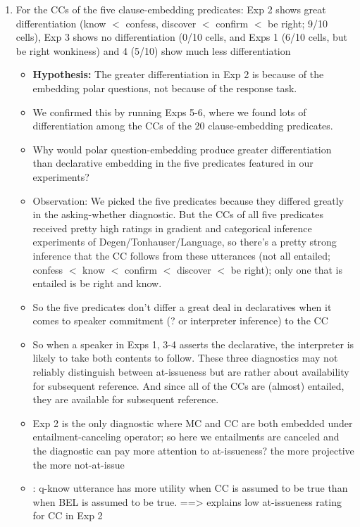 \documentclass[times,linguex]{glossa}
\begin{document}
\begin{enumerate}
  
  \item For the CCs of the five clause-embedding predicates: Exp 2 shows great differentiation (know $<$ confess, discover $<$ confirm $<$ be right; 9/10 cells), Exp 3 shows no differentiation (0/10 cells, and Exps 1 (6/10 cells, but be right wonkiness) and 4 (5/10) show much less differentiation
  
  \begin{itemize}
    
    \item {\bf Hypothesis:} The greater differentiation in Exp 2 is because of the embedding polar questions, not because of the response task.
    
    \item We confirmed this by running Exps 5-6, where we found lots of differentiation among the CCs of the 20 clause-embedding predicates.
    
    \item Why would polar question-embedding produce greater differentiation than declarative embedding in the five predicates featured in our experiments?
    
    \item Observation: We picked the five predicates because they differed greatly in the asking-whether diagnostic. But the CCs of all five predicates received pretty high ratings in gradient and categorical inference experiments of Degen/Tonhauser/Language, so there's a pretty strong inference that the CC follows from these utterances (not all entailed; confess $<$ know $<$ confirm $<$ discover $<$ be right); only one that is entailed is be right and know. 
    
    \item So the five predicates don't differ a great deal in declaratives when it comes to speaker commitment (? or interpreter inference) to the CC
    
    \item So when a speaker in Exps 1, 3-4 asserts the declarative, the interpreter is likely to take both contents to follow. These three diagnostics may not reliably distinguish between at-issueness but are rather about availability for subsequent reference. And since all of the CCs are (almost) entailed, they are available for subsequent reference.
    
    \item Exp 2 is the only diagnostic where MC and CC are both embedded under entailment-canceling operator; so here we entailments are canceled and the diagnostic can pay more attention to at-issueness? the more projective the more not-at-issue
    
    \item \citealt{scontras-tonhauser2025,scontras-tonhauser2026}: q-know utterance has more utility when CC is assumed to be true than when BEL is assumed to be true. ==> explains low at-issueness rating for CC in Exp 2
    
  \end{itemize}
  
\end{enumerate}






\end{document}
